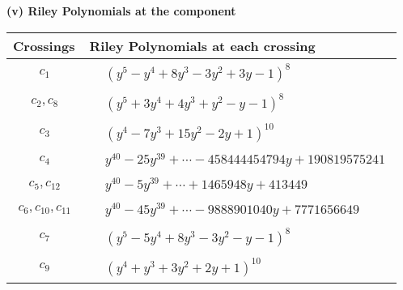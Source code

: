\documentclass[1p]{elsarticle_modified}
\theoremstyle{definition}
\begin{document}
\newpage\renewcommand{\arraystretch}{1}
\flushleft \textbf{(v) Riley Polynomials at the component}\newline \\
\begin{tabular}{m{50pt}|m{274pt}}
Crossings & \hspace{64pt}Riley Polynomials at each crossing \\
\hline $$\begin{aligned}c_{1}\end{aligned}$$&$\begin{aligned}
&(y^5- y^4+8 y^3-3 y^2+3 y-1)^8
\end{aligned}$\\
\hline $$\begin{aligned}c_{2},c_{8}\end{aligned}$$&$\begin{aligned}
&(y^5+3 y^4+4 y^3+y^2- y-1)^8
\end{aligned}$\\
\hline $$\begin{aligned}c_{3}\end{aligned}$$&$\begin{aligned}
&(y^4-7 y^3+15 y^2-2 y+1)^{10}
\end{aligned}$\\
\hline $$\begin{aligned}c_{4}\end{aligned}$$&$\begin{aligned}
&y^{40}-25 y^{39}+\cdots-458444454794 y+190819575241
\end{aligned}$\\
\hline $$\begin{aligned}c_{5},c_{12}\end{aligned}$$&$\begin{aligned}
&y^{40}-5 y^{39}+\cdots+1465948 y+413449
\end{aligned}$\\
\hline $$\begin{aligned}c_{6},c_{10},c_{11}\end{aligned}$$&$\begin{aligned}
&y^{40}-45 y^{39}+\cdots-9888901040 y+7771656649
\end{aligned}$\\
\hline $$\begin{aligned}c_{7}\end{aligned}$$&$\begin{aligned}
&(y^5-5 y^4+8 y^3-3 y^2- y-1)^8
\end{aligned}$\\
\hline $$\begin{aligned}c_{9}\end{aligned}$$&$\begin{aligned}
&(y^4+y^3+3 y^2+2 y+1)^{10}
\end{aligned}$\\
\hline
\end{tabular}\\~\\
\end{document}
